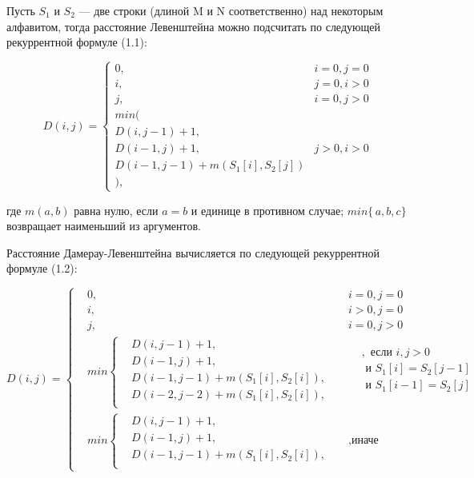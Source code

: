 \documentclass[12pt]{report}
\begin{document}
Пусть $S_{1}$ и $S_{2}$ — две строки (длиной M и N соответственно) над некоторым алфавитом, тогда расстояние Левенштейна можно подсчитать по следующей рекуррентной формуле (1.1):

\begin{equation}
D(i,j) = \left\{ \begin{array}{ll}
 0, & \textrm{$i = 0, j = 0$}\\
 i, & \textrm{$j = 0, i > 0$}\\
 j, & \textrm{$i = 0, j > 0$}\\
min(\\
D(i,j-1)+1,\\
D(i-1, j) +1, &\textrm{$j>0, i>0$}\\
D(i-1, j-1) + m(S_{1}[i], S_{2}[j])\\
),
  \end{array} \right.
\end{equation}

где $m(a,b)$ равна нулю, если $a=b$ и единице в противном случае; $min\{\,a,b,c\}$ возвращает наименьший из аргументов.

Расстояние Дамерау-Левенштейна вычисляется по следующей рекуррентной формуле (1.2):

\begin{equation}	    
D(i, j) =  \left\{
	\begin{aligned}
		&0, && i = 0, j = 0\\
		    	&i, && i > 0, j = 0\\
		    	&j, && i = 0, j > 0\\		    	
		    	&min \left\{
				\begin{aligned}
					&D(i, j - 1) + 1,\\
		            &D(i - 1, j) + 1,\\
		            &D(i - 1, j - 1) + m(S_{1}[i], S_{2}[i]), \\
		            &D(i - 2, j - 2) + m(S_{1}[i], S_{2}[i]),\\
		        \end{aligned} \right.
		        && 
				\begin{aligned}
					&, \text{ если } i, j > 0 \\
		            & \text{ и } S_{1}[i] = S_{2}[j - 1] \\
		            & \text{ и } S_{1}[i - 1] =  S_{2}[j] \\
		        \end{aligned} \\ 
		        &min \left\{
		        \begin{aligned}
		            &D(i, j - 1) + 1,\\
		            &D(i - 1, j) + 1, \\
		            &D(i - 1, j - 1) + m(S_{1}[i], S_{2}[i]),\\
		        \end{aligned} \right.  &&, \text{иначе}
			\end{aligned} \right.
\end{equation}
\end{document}
